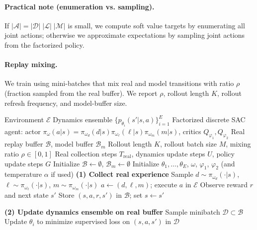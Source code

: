 \documentclass[preprint,12pt]{elsarticle}
\begin{document}
\begin{frontmatter}
\paragraph{Practical note (enumeration vs. sampling).}
If $|\mathcal{A}|=|\mathcal{D}|\;|\mathcal{L}|\;|\mathcal{M}|$ is small, we compute soft value targets by enumerating all joint actions; otherwise we approximate expectations by sampling joint actions from the factorized policy.

\paragraph{Replay mixing.}
We train using mini-batches that mix real and model transitions with ratio $\rho$ (fraction sampled from the real buffer). We report $\rho$, rollout length $K$, rollout refresh frequency, and model-buffer size.

\begin{algorithm}[H]
\caption{MBPO with Factorized Discrete SAC for Multi-Discrete Tutoring Actions}
\label{alg:mbpo_discrete_sac}
\begin{algorithmic}[1]
\Require Environment $\mathcal{E}$
\Require Dynamics ensemble $\{p_{\theta_i}(s'|s,a)\}_{i=1}^E$
\Require Factorized discrete SAC agent: actor $\pi_\omega(a|s)=\pi_{\omega_d}(d|s)\pi_{\omega_\ell}(\ell|s)\pi_{\omega_m}(m|s)$, critics $Q_{\varphi_1},Q_{\varphi_2}$
\Require Real replay buffer $\mathcal{B}$, model buffer $\mathcal{B}_m$
\Require Rollout length $K$, rollout batch size $M$, mixing ratio $\rho \in [0,1]$
\Require Real collection steps $T_{\text{real}}$, dynamics update steps $U$, policy update steps $G$
\State Initialize $\mathcal{B} \gets \emptyset$, $\mathcal{B}_m \gets \emptyset$
\State Initialize $\theta_1,\dots,\theta_E$, $\omega$, $\varphi_1$, $\varphi_2$ (and temperature $\alpha$ if used)
    \State \textbf{(1) Collect real experience}
        \State Sample $d \sim \pi_{\omega_d}(\cdot|s)$, $\ell \sim \pi_{\omega_\ell}(\cdot|s)$, $m \sim \pi_{\omega_m}(\cdot|s)$
        \State $a \gets (d,\ell,m)$; execute $a$ in $\mathcal{E}$
        \State Observe reward $r$ and next state $s'$
        \State Store $(s,a,r,s')$ in $\mathcal{B}$; set $s \gets s'$
    \EndFor

    \State \textbf{(2) Update dynamics ensemble on real buffer}
        \State Sample minibatch $\mathcal{D} \subset \mathcal{B}$
            \State Update $\theta_i$ to minimize supervised loss on $(s,a,s')$ in $\mathcal{D}$
        \EndFor
    \EndFor


\end{algorithmic}
\end{algorithm}
\end{frontmatter}
\end{document}
